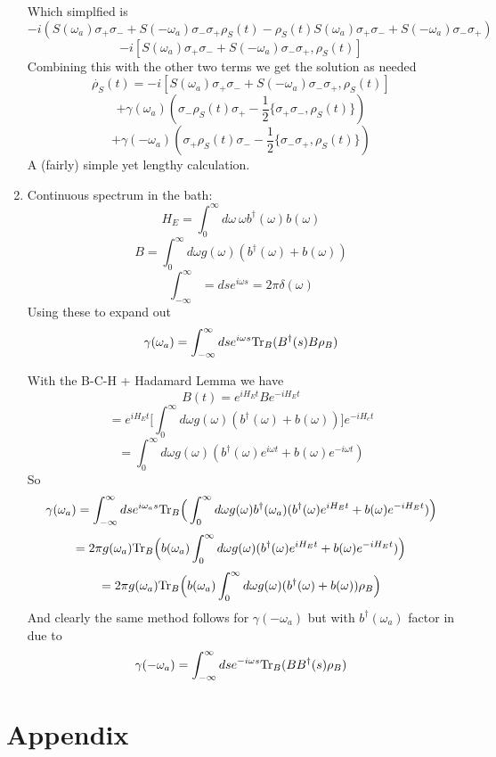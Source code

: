 \documentclass[12pt]{article}
\newcommand{\Tr}{{\rm Tr}}
\begin{document}
\begin{enumerate}
Which simplfied is 
$$ -i ( S(\omega_a) \sigma_+ \sigma_- + S ( - \omega_a ) \sigma_- \sigma_+ \rho_S(t) - \rho_S(t) S(\omega_a ) \sigma_+ \sigma_- + S(- \omega_a) \sigma_- \sigma_+ ) $$
$$ -i [ S(\omega_a) \sigma_+ \sigma_- + S(- \omega_a) \sigma_- \sigma_+, \rho_S (t) ] $$
Combining this with the other two terms we get the solution as needed 
$$ \dot{\rho_S}(t) = -i [ S(\omega_a) \sigma_+ \sigma_- + S(- \omega_a) \sigma_- \sigma_+, \rho_S (t) ] $$
$$ + \gamma (\omega_a ) ( \sigma_- \rho_S (t) \sigma_+ - \frac{1}{2} \{ \sigma_+ \sigma_-, \rho_S (t) \}) $$
$$ + \gamma (- \omega_a ) ( \sigma_+ \rho_S (t) \sigma_- - \frac{1}{2} \{ \sigma_- \sigma_+, \rho_S (t) \}) $$
A (fairly) simple yet lengthy calculation.

\item Continuous spectrum in the bath: 
$$ H_E = \int_0^{\infty} d \omega \ \omega b^{\dagger} (\omega) b (\omega) $$
$$ B = \int_0^{\infty} d \omega g (\omega) ( b^{\dagger} (\omega) + b (\omega)) $$
$$ \int_{- \infty}^{\infty} = ds e^{i \omega s} = 2 \pi \delta (\omega) $$
Using these to expand out 
$$ \gamma (\omega_a) = \int_{- \infty}^{\infty} ds e^{i \omega s} \Tr_B (B^{\dagger} (s) B \rho_B )  $$

With the B-C-H + Hadamard Lemma we have 
$$ B(t) = e^{i H_E t} B e^{-i H_E t} $$
$$ = e^{i H_E t} \Big[\int_0^{\infty} d \omega g (\omega) (b^{\dagger} (\omega) + b (\omega) )\Big] e^{-i H_e t} $$
$$ = \int_0^{\infty} d \omega g (\omega) ( b^{\dagger} (\omega) e^{i \omega t} + b (\omega) e^{-i \omega t} ) $$
So 
$$ \gamma (\omega_a) = \int_{- \infty}^{\infty} ds e^{i \omega_a s} \Tr_B \Big( \int_0^{\infty} d \omega g( \omega) b^{\dagger} (\omega_a) (b^{\dagger} (\omega) e^{i H_E t} + b (\omega) e^{-i H_E t} )  \Big) $$
$$ = 2 \pi g(\omega_a) \Tr_B \Big( b (\omega_a) \int_0^{\infty} d \omega g (\omega) (b^{\dagger} (\omega) e^{i H_E t} + b (\omega) e^{-i H_E t} ) \Big) $$
$$ = 2 \pi g(\omega_a) \Tr_B \Big( b (\omega_a) \int_0^{\infty} d \omega g (\omega) (b^{\dagger} (\omega)+ b (\omega) ) \rho_B \Big) $$
And clearly the same method follows for $\gamma (- \omega_a)$ but with $b^{\dagger} (\omega_a)$ factor in due to 
$$ \gamma (-\omega_a) = \int_{- \infty}^{\infty} ds e^{-i \omega s} \Tr_B (B B^{\dagger} (s)  \rho_B )  $$



\end{enumerate}






\section{Appendix}
\end{document}
